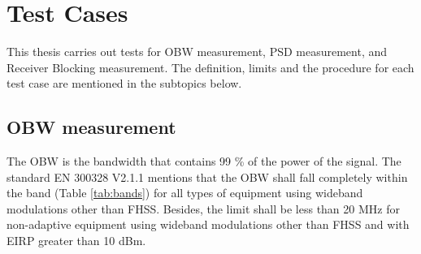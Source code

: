 \chapter{Test Cases}\label{chap:test}

This thesis carries out tests for \acf{OBW} measurement, \acf{PSD} measurement, and Receiver Blocking measurement. The definition, limits and the procedure for each test case are mentioned in the subtopics below.

\section{\acl{OBW} measurement}
\label{sec:obw}

The \acf{OBW} is the bandwidth that contains 99 \% of the power of the signal. The standard EN 300328 V2.1.1 \cite{etsi300328} mentions that the \acf{OBW} shall fall completely within the band (Table \ref{tab:bands}) for all types of equipment using wideband modulations other than \acs{FHSS}.  Besides, the limit shall be less than 20 MHz for non-adaptive equipment using wideband modulations other than \acs{FHSS} and with \acs{EIRP} greater than 10 dBm.

